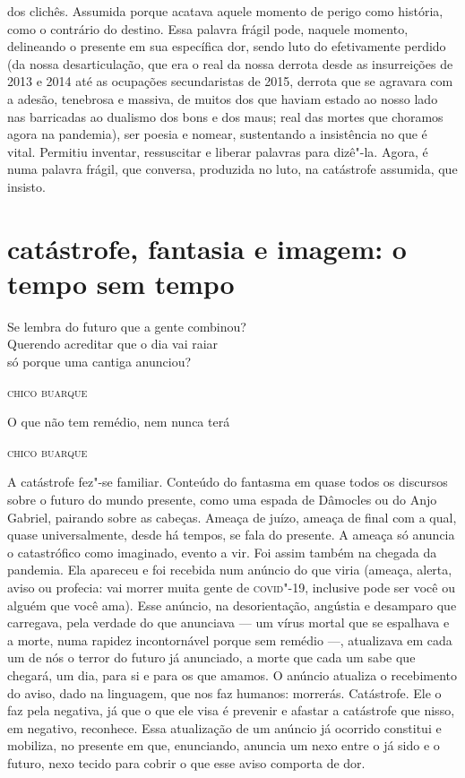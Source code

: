 dos clichês. Assumida porque acatava aquele momento de perigo como
história, como o contrário do destino. Essa palavra frágil pode, naquele
momento, delineando o presente em sua específica dor, sendo luto do
efetivamente perdido (da nossa desarticulação, que era o real da nossa
derrota desde as insurreições de 2013 e 2014 até as ocupações
secundaristas de 2015, derrota que se agravara com a adesão, tenebrosa e
massiva, de muitos dos que haviam estado ao nosso lado nas barricadas ao
dualismo dos bons e dos maus; real das mortes que choramos agora na
pandemia), ser poesia e nomear, sustentando a insistência no que é
vital. Permitiu inventar, ressuscitar e liberar palavras para dizê"-la.
Agora, é numa palavra frágil, que conversa, produzida no luto, na
catástrofe assumida, que insisto.

\section{catástrofe, fantasia e imagem: o tempo sem tempo}

{\setlength{\epigraphwidth}{.6\textwidth}
\epigraph{Se lembra do futuro que a gente combinou?\\
Querendo acreditar que o dia vai raiar\\
só porque uma cantiga anunciou?}{\textsc{chico buarque}}}

\epigraph{O que não tem remédio, nem nunca terá}{\textsc{chico buarque}}

A catástrofe fez"-se familiar. Conteúdo do fantasma em quase todos os
discursos sobre o futuro do mundo presente, como uma espada de Dâmocles
ou do Anjo Gabriel, pairando sobre as cabeças. Ameaça de juízo, ameaça
de final com a qual, quase universalmente, desde há tempos, se fala do
presente. A ameaça só anuncia o catastrófico como imaginado, evento a
vir. Foi assim também na chegada da pandemia. Ela apareceu e foi
recebida num anúncio do que viria (ameaça, alerta, aviso ou profecia:
vai morrer muita gente de \textsc{covid}"-19, inclusive pode ser você ou alguém
que você ama). Esse anúncio, na desorientação, angústia e desamparo que
carregava, pela verdade do que anunciava --- um vírus mortal que se
espalhava e a morte, numa rapidez incontornável porque sem remédio ---,
atualizava em cada um de nós o terror do futuro já anunciado, a morte
que cada um sabe que chegará, um dia, para si e para os que amamos. O
anúncio atualiza o recebimento do aviso, dado na linguagem, que nos faz
humanos: morrerás. Catástrofe. Ele o faz pela negativa, já que o que ele
visa é prevenir e afastar a catástrofe que nisso, em negativo,
reconhece. Essa atualização de um anúncio já ocorrido constitui e
mobiliza, no presente em que, enunciando, anuncia um nexo entre o já
sido e o futuro, nexo tecido para cobrir o que esse aviso comporta de
dor.

